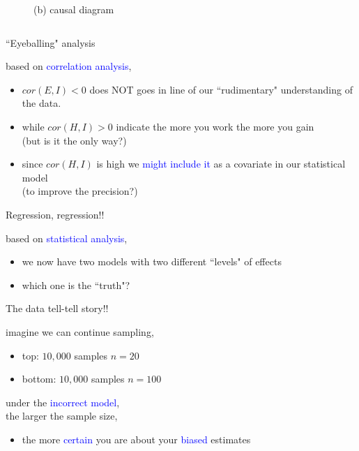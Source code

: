 \begin{frame}
\begin{columns}
\begin{column}{0.5\textwidth}
\begin{figure}
				\caption*{(b) causal diagram}
			\end{figure}
		\end{column}
	\end{columns}
\end{frame}
%
%
\begin{lhframe}[rhgraphic={\texttt{[image: descendant1\_panel.pdf]}}]
	{``Eyeballing" analysis}
	
	based on \textcolor{blue}{correlation analysis},
	\begin{itemize}
		\item $cor(E, I)<0$ does NOT goes in line of our ``rudimentary" understanding of the data.
		\item while $cor(H, I)>0$ indicate the more you work the more you gain \\
		{\small (but is it the only way?)}
		\item since $cor(H, I)$ is high we \textcolor{blue}{might include it} as a covariate in our statistical model \\
		{\small (to improve the precision?)}
	\end{itemize}
\end{lhframe}
%
%
\begin{lhframe}[rhgraphic={\texttt{[image: descendant1\_reg.png]}}]
	{Regression, regression!!}
	
	based on \textcolor{blue}{statistical analysis},
	\begin{itemize}
		\item we now have two models with two different ``levels" of effects
		\item which one is the ``truth"?
	\end{itemize}
\end{lhframe}
%
%
\begin{lhframe}[rhgraphic={\texttt{[image: descendant1\_samplesize.pdf]}}]
	{The data tell-tell story!!}
	
	imagine we can continue sampling,
	\begin{itemize}
		\item top: $10,000$ samples $n=20$
		\item bottom: $10,000$ samples $n=100$
	\end{itemize}
	
	under the \textcolor{blue}{incorrect model},\\
	the larger the sample size,
	\begin{itemize}
		\item the more \textcolor{blue}{certain} you are about your \textcolor{blue}{biased} estimates
	\end{itemize}
\end{lhframe}
